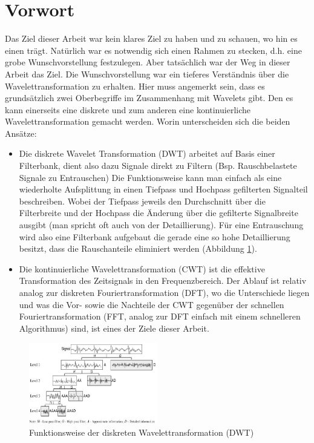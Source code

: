 %
%
%
%
\section{Vorwort\label{wavelets:section:teil0}}
Das Ziel dieser Arbeit war kein klares Ziel zu haben und zu schauen, wo hin es einen trägt. Natürlich war es notwendig sich einen Rahmen zu stecken, d.h. eine grobe Wunschvorstellung festzulegen. Aber tatsächlich war der Weg in dieser Arbeit das Ziel.
Die Wunschvorstellung war ein tieferes Verständnis über die Wavelettransformation zu erhalten. Hier muss angemerkt sein, dass es grundsätzlich zwei Oberbegriffe im Zusammenhang mit Wavelets gibt.
Den es kann einerseits eine diskrete und zum anderen eine kontinuierliche Wavelettransformation gemacht werden. Worin unterscheiden sich die beiden Ansätze:

\begin{itemize}
	\item   Die diskrete Wavelet Transformation (DWT) arbeitet auf Basis einer Filterbank, dient also dazu Signale direkt zu Filtern (Bsp. Rauschbelastete Signale zu Entrauschen)
	Die Funktionsweise kann man einfach als eine wiederholte Aufsplittung in einen Tiefpass und Hochpass gefilterten Signalteil beschreiben. Wobei der Tiefpass jeweils den Durchschnitt über die Filterbreite und der Hochpass die Änderung über die gefilterte Signalbreite ausgibt (man spricht oft auch von der Detaillierung). Für eine Entrauschung wird also eine Filterbank aufgebaut die gerade eine so hohe Detaillierung besitzt, dass die Rauschanteile eliminiert werden (Abbildung \ref{wavelet:fig:1_Four-Level-Wavelet-Decomposition}).

 	\item Die kontinuierliche Wavelettransformation (CWT) ist die effektive Transformation des Zeitsignals in den Frequenzbereich. Der Ablauf ist relativ analog zur diskreten Fouriertransformation (DFT), wo die Unterschiede liegen und was die Vor- sowie die Nachteile der CWT gegenüber der schnellen Fouriertransformation (FFT, analog zur DFT einfach mit einem schnelleren Algorithmus) sind, ist eines der Ziele dieser Arbeit. 
\end{itemize}

\begin{figure}
	\centering
	\includegraphics[width=0.5\textwidth]{papers/wavelets/images/1_Four-Level-Wavelet-Decomposition.png}
	\caption{Funktionsweise der diskreten Wavelettransformation (DWT) }
	\label{wavelet:fig:1_Four-Level-Wavelet-Decomposition}
\end{figure}

